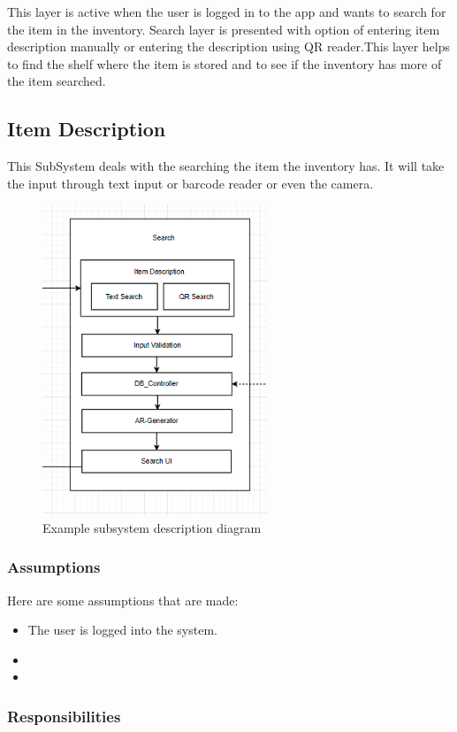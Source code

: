 
This layer is active when the user is logged in to the app and wants to search for the item in the inventory. Search layer is presented with option of entering item description manually or entering the description using QR reader.This layer helps to find the shelf where the item is stored and to see if the inventory has more of the item searched.
\subsection{Item Description}
This SubSystem deals with the searching the item the inventory has. It will take the input through text input or barcode reader or even the camera.

\begin{figure}[h!]
	\centering
 	\includegraphics[width=0.60\textwidth]{images/Capture}
 \caption{Example subsystem description diagram}
\end{figure}

\subsubsection{Assumptions}
Here are some assumptions that are made:
\begin{itemize}
    \item The user is logged into the system. 
    \item 
    \item
\end{itemize}

\subsubsection{Responsibilities}


